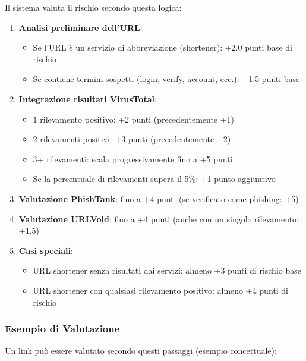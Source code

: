 \documentclass{article}
\begin{document}
Il sistema valuta il rischio secondo questa logica:

\begin{enumerate}
    \item \textbf{Analisi preliminare dell'URL}: 
    \begin{itemize}
        \item Se l'URL è un servizio di abbreviazione (shortener): +2.0 punti base di rischio
        \item Se contiene termini sospetti (login, verify, account, ecc.): +1.5 punti base
    \end{itemize}
    
    \item \textbf{Integrazione risultati VirusTotal}:
    \begin{itemize}
        \item 1 rilevamento positivo: +2 punti (precedentemente +1)
        \item 2 rilevamenti positivi: +3 punti (precedentemente +2)
        \item 3+ rilevamenti: scala progressivamente fino a +5 punti
        \item Se la percentuale di rilevamenti supera il 5\%: +1 punto aggiuntivo
    \end{itemize}
    
    \item \textbf{Valutazione PhishTank}: fino a +4 punti (se verificato come phishing: +5)
    
    \item \textbf{Valutazione URLVoid}: fino a +4 punti (anche con un singolo rilevamento: +1.5)
    
    \item \textbf{Casi speciali}:
    \begin{itemize}
        \item URL shortener senza risultati dai servizi: almeno +3 punti di rischio base
        \item URL shortener con qualsiasi rilevamento positivo: almeno +4 punti di rischio
    \end{itemize}
\end{enumerate}

\subsubsection{Esempio di Valutazione}

Un link può essere valutato secondo questi passaggi (esempio concettuale):
\end{document}

